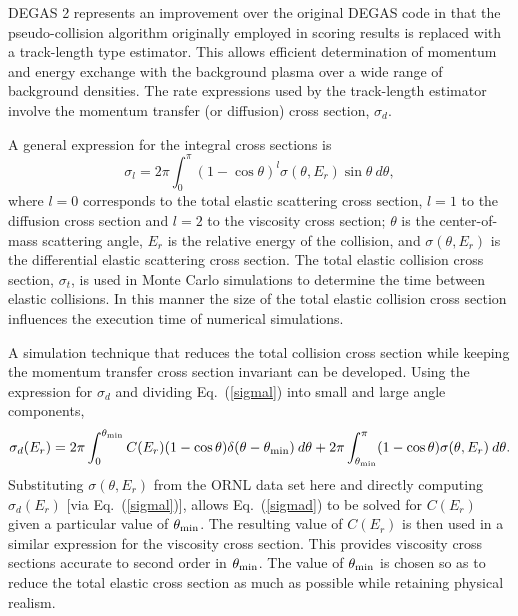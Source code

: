 \documentclass[12pt]{report}
\begin{document}
DEGAS 2 represents an improvement over the
original DEGAS code in that the pseudo-collision algorithm originally
employed in scoring results\cite{Heif82} is replaced with a track-length type
estimator.  This allows efficient determination of momentum and energy
exchange with the background plasma over a wide range of background
densities.  The rate expressions used by the track-length estimator
involve the momentum transfer (or diffusion) 
cross section, $\sigma_{d}$\cite{Bach95}.

A general
expression for the integral cross sections is\cite{Bach95}
\begin{equation}
\sigma_{l} = 2 \pi \int_{0}^{\pi} \left( 1 - \cos \theta \right)^{l}
\sigma(\theta, E_{r}) \sin \theta \: d \theta,
\label{sigmal}
\end{equation}
where $l=0$
corresponds to the total elastic scattering cross section, $l=1$ to the
diffusion cross section and $l=2$ to the viscosity cross
section; $\theta$ is the center-of-mass scattering angle, $E_{r}$ 
is the relative
energy of the collision, and $\sigma(\theta,E_{r})$ is the differential elastic
scattering cross section.  The total elastic collision cross section,
$\sigma_{t}$, is used in Monte Carlo simulations to determine the time between
elastic collisions.  In this manner the size of the total elastic
collision cross section influences the execution time of numerical
simulations.

A simulation technique that reduces the total
collision cross section while keeping the momentum transfer cross
section invariant can be developed.  Using the expression for $\sigma_{d}$ and
dividing Eq.~(\ref{sigmal}) into small and large angle components,
\begin{equation}
\sigma_{d} (E_{r}) = 2 \pi \int_{0}^{\theta_{\rm min}} C(E_{r})
( 1 - \cos \theta) \delta(\theta - \theta_{\rm min}) \: d \theta 
+ 2 \pi \int^{\pi}_{\theta_{\rm min}} 
( 1 - \cos \theta) \sigma(\theta, E_{r}) \: d \theta.
\label{sigmad}
\end{equation}
Substituting $\sigma(\theta,E_{r})$ from the ORNL data set here and directly
computing $\sigma_{d}(E_{r})$  [via Eq.~(\ref{sigmal})], 
allows Eq.~(\ref{sigmad}) to be solved for
$C(E_{r})$ given a particular value of $\theta_{\rm min}$.  
The resulting value of $C(E_{r})$
is then used in a similar expression for the viscosity cross section.
This provides viscosity cross sections accurate to second order in
$\theta_{\rm min}$.  The value of $\theta_{\rm min}$ 
is chosen so as to reduce the total elastic
cross section as much as possible while retaining physical realism.
\end{document}
